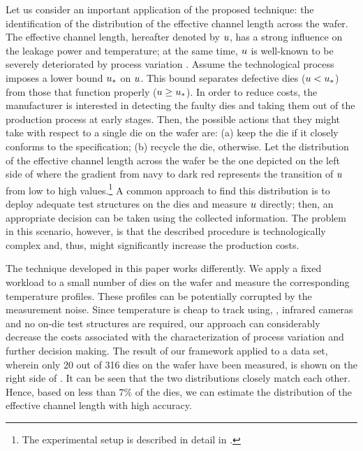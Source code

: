 
Let us consider an important application of the proposed technique: the identification of the distribution of the effective channel length across the wafer. The effective channel length, hereafter denoted by $u$, has a strong influence on the leakage power and temperature; at the same time, $u$ is well-known to be severely deteriorated by process variation \cite{srivastava2010, juan2011, juan2012}.
Assume the technological process imposes a lower bound $u_*$ on $u$. This bound separates defective dies ($u < u_*$) from those that function properly ($u \geq u_*$).
In order to reduce costs, the manufacturer is interested in detecting the faulty dies and taking them out of the production process at early stages. Then, the possible actions that they might take with respect to a single die on the wafer are: (a) keep the die if it closely conforms to the specification; (b) recycle the die, otherwise.
Let the distribution of the effective channel length across the wafer be the one depicted on the left side of  where the gradient from navy to dark red represents the transition of $u$ from low to high values.\footnote{The experimental setup is described in detail in .}
A common approach to find this distribution is to deploy adequate test structures on the dies and measure $u$ directly; then, an appropriate decision can be taken using the collected information. The problem in this scenario, however, is that the described procedure is technologically complex and, thus, might significantly increase the production costs.

The technique developed in this paper works differently. We apply a fixed workload to a small number of dies on the wafer and measure the corresponding temperature profiles. These profiles can be potentially corrupted by the measurement noise. Since temperature is cheap to track using, \eg, infrared cameras and no on-die test structures are required, our approach can considerably decrease the costs associated with the characterization of process variation and further decision making.
The result of our framework applied to a data set, wherein only 20 out of 316 dies on the wafer have been measured, is shown on the right side of . It can be seen that the two distributions closely match each other. Hence, based on less than $7\%$ of the dies, we can estimate the distribution of the effective channel length with high accuracy.

